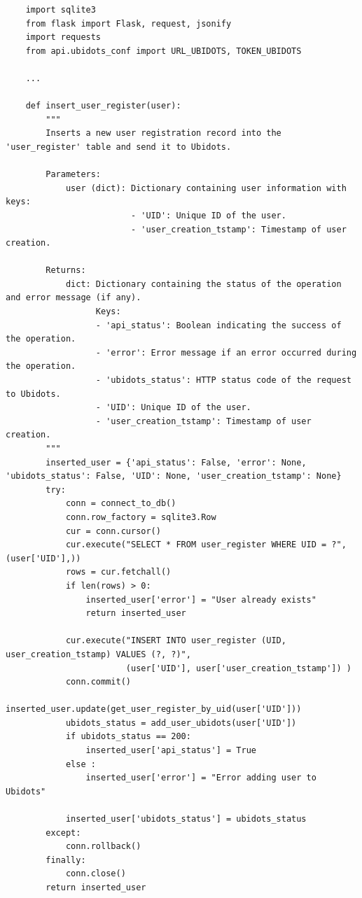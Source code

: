 \documentclass{article}
\begin{document}
\begin{lstlisting}
    import sqlite3
    from flask import Flask, request, jsonify
    import requests
    from api.ubidots_conf import URL_UBIDOTS, TOKEN_UBIDOTS
    
    ...
    
    def insert_user_register(user):
        """
        Inserts a new user registration record into the 'user_register' table and send it to Ubidots.
    
        Parameters:
            user (dict): Dictionary containing user information with keys:
                         - 'UID': Unique ID of the user.
                         - 'user_creation_tstamp': Timestamp of user creation.
    
        Returns:
            dict: Dictionary containing the status of the operation and error message (if any).
                  Keys:
                  - 'api_status': Boolean indicating the success of the operation.
                  - 'error': Error message if an error occurred during the operation.
                  - 'ubidots_status': HTTP status code of the request to Ubidots.
                  - 'UID': Unique ID of the user.
                  - 'user_creation_tstamp': Timestamp of user creation.
        """
        inserted_user = {'api_status': False, 'error': None, 'ubidots_status': False, 'UID': None, 'user_creation_tstamp': None}
        try:
            conn = connect_to_db()
            conn.row_factory = sqlite3.Row
            cur = conn.cursor()
            cur.execute("SELECT * FROM user_register WHERE UID = ?", (user['UID'],))
            rows = cur.fetchall()
            if len(rows) > 0:
                inserted_user['error'] = "User already exists"
                return inserted_user
            
            cur.execute("INSERT INTO user_register (UID, user_creation_tstamp) VALUES (?, ?)",
                        (user['UID'], user['user_creation_tstamp']) )
            conn.commit()
            inserted_user.update(get_user_register_by_uid(user['UID']))
            ubidots_status = add_user_ubidots(user['UID'])
            if ubidots_status == 200:
                inserted_user['api_status'] = True
            else :
                inserted_user['error'] = "Error adding user to Ubidots"
                
            inserted_user['ubidots_status'] = ubidots_status
        except:
            conn.rollback()
        finally:
            conn.close()
        return inserted_user
    

\end{lstlisting}
\end{document}
